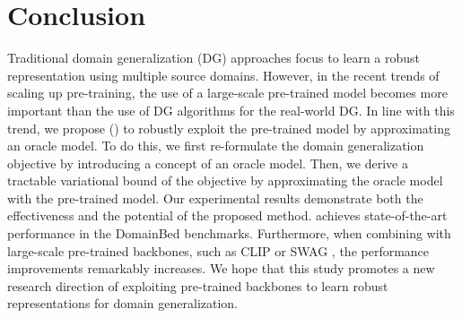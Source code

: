 \section{Conclusion}
Traditional domain generalization (DG) approaches focus to learn a robust representation using multiple source domains.
However, in the recent trends of scaling up pre-training, the use of a large-scale pre-trained model becomes more important than the use of DG algorithms for the real-world DG.
In line with this trend, we propose \fullname{} (\method{}) to robustly exploit the pre-trained model by approximating an oracle model.
To do this, we first re-formulate the domain generalization objective by introducing a concept of an oracle model.
Then, we derive a tractable variational bound of the objective by approximating the oracle model with the pre-trained model.
Our experimental results demonstrate both the effectiveness and the potential of the proposed method. \method{} achieves state-of-the-art performance in the DomainBed benchmarks. Furthermore, when combining \method{} with large-scale pre-trained backbones, such as CLIP \cite{radford2021clip} or SWAG \cite{singh2022swag}, the performance improvements remarkably increases. 
We hope that this study promotes a new research direction of exploiting pre-trained backbones to learn robust representations for domain generalization.